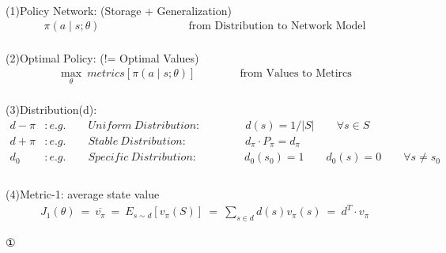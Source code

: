 \documentclass{article}
\begin{document}
~ \\[3pt]
(1)Policy Network: (Storage + Generalization) 
\begin{align*}
    \pi (a \mid s; \theta ) 
    \qquad \qquad \qquad \qquad \text{from Distribution to Network Model} 
\end{align*}
~ \\[3pt]
(2)Optimal Policy: (!= Optimal Values) 
\begin{align*}
    \max_{\theta} \ metrics[ \pi (a \mid s; \theta ) ] 
    \qquad \qquad \text{from Values to Metircs} 
\end{align*}
~ \\[3pt]
(3)Distribution(d): 
\begin{align*}
    d - \pi &: e.g. 
            \qquad Uniform \ Distribution : \qquad \qquad 
            d(s) = 1 / | S | \qquad \forall s \in S \\[3pt]
    d + \pi &: e.g. 
            \qquad Stable \ Distribution : \qquad \qquad \quad \ 
            d_{\pi} \cdot P_{\pi} = d_{\pi} \\[3pt]
    d_{0}   &: e.g. 
            \qquad Specific \ Distribution : \qquad \qquad \ 
            d_{0}(s_{0}) = 1 
            \qquad  d_{0}(s) = 0 \qquad \forall s \neq s_{0} \\[3pt]
\end{align*}
~ \\[3pt]
(4)Metric-1: average state value 
\begin{align*}
    J_{1} (\theta) \ = \ \overline{v_{\pi}} 
                   \ = \ E_{s \sim d} [ v_{\pi}(S) ] 
                   \ = \ \sum_{s \in d} d(s) v_{\pi}(s) 
                   \ = \ d^{T} \cdot v_{\pi} 
\end{align*}


\begin{CJK}{UTF8}{gbsn}
    ①
\end{CJK}
\end{document}
